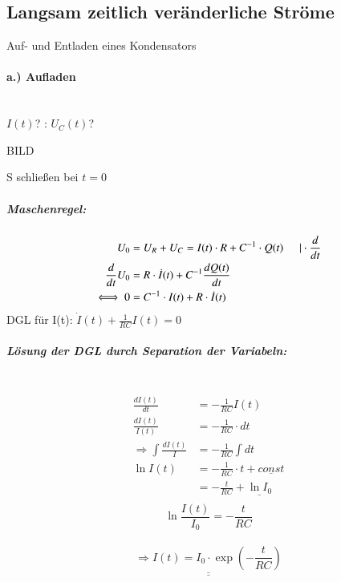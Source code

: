 \subsection{Langsam zeitlich veränderliche Ströme}

Auf- und Entladen eines Kondensators

\paragraph{a.) Aufladen} \hfill \\

$ I(t) $? : $ U_C(t) $?

BILD

S schließen bei $ t=0 $

	\subparagraph{Maschenregel:}
		\begin{align*}
			U_0& = U_R+U_C = I(t) \cdot R + C^{-1} \cdot Q(t)  \hspace{5mm} | \cdot \frac{d}{dt} \\
			\frac{d}{dt} U_0 &=R \cdot \dot{I}(t) + C^{-1} \frac{dQ(t)}{dt} \\
			\iff 0 &= C^{-1} \cdot I(t) + R \cdot \dot{I}(t) 
		\end{align*}
		DGL für I(t): $ \boxed{\dot{I}(t) + \frac{1}{RC} I(t) = 0} $ \\
		
	\subparagraph{Lösung der DGL durch Separation der Variabeln:}\hfill \\
		\begin{align*}
		\frac{dI(t)}{dt} &= - \frac{1}{RC} I(t)\\
		\frac{dI(t)}{I(t)} &= - \frac{1}{RC} \cdot dt \\
		\Rightarrow \int \frac{dI(t)}{I} &= - \frac{1}{RC} \int dt \\
		\ln I(t) &= - \frac{1}{RC} \cdot t + \underline{const} \\
		&= - \frac{t}{RC} + \underline{\ln I_0} \\
		\end{align*}
		$$\ln\frac{I(t)}{I_0} = -\frac{t}{RC}$$ \\ 
		$$\underline{\underline{\Rightarrow I(t) = I_0 \cdot \exp(-\frac{t}{RC})}}$$
		
